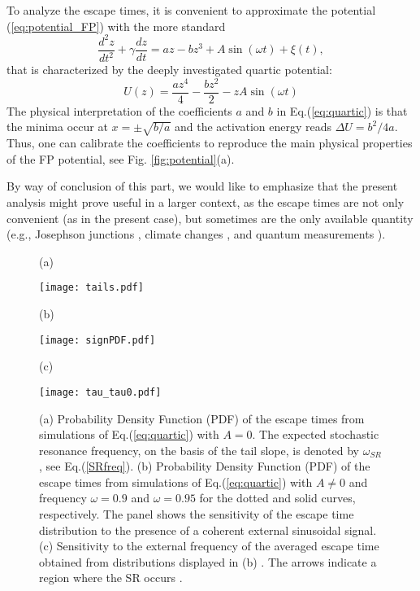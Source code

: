 \documentclass[conference]{IEEEtran}
\newcommand{\beq}{\begin{equation}}
\newcommand{\eeq}{\end{equation}}
\begin{document}
To analyze the escape times, it is convenient to approximate the potential (\ref{eq:potential_FP}) with the more standard 
\beq
\frac{d^2 z}{dt^2} + \gamma \frac{dz}{dt} =  a z - b z^3 + A \sin\left( \omega t \right) +  \xi(t),
\label{eq:quartic}
\eeq
\noindent 
that is characterized by the deeply investigated quartic potential:
\beq
U(z)= \frac{a z^4}{4} - \frac{b z^2}{2} - z A  \sin \left(\omega t \right)
   \label{eq:potential_quartic}
\eeq
The physical interpretation of the coefficients $a$ and $b$ in Eq.(\ref{eq:quartic}) is that the minima occur at $x=\pm \sqrt{{b}/{a}}$ and the activation energy reads $ \Delta U = {b^2}/{4a}$. Thus, one can calibrate the coefficients to reproduce the main physical properties of the FP potential, see Fig. \ref{fig:potential}(a). 

By way of conclusion of this part, we would like to emphasize that the present analysis might prove useful in a larger context, as the escape times are not only convenient (as in the present case), but sometimes are the only available quantity (e.g., Josephson junctions \cite{Addesso12}, climate changes \cite{Benzi82}, and quantum measurements \cite{Aspelmeyer14}). 

\begin{figure}[t]
\centerline{(a) }
\centerline{\texttt{[image: tails.pdf]}}
\centerline{(b) }
\centerline{\texttt{[image: signPDF.pdf]}}
\centerline{(c)}
\centerline{\texttt{[image: tau\_tau0.pdf]}}
\caption{
(a) Probability Density Function (PDF) of the escape times from simulations of Eq.(\ref{eq:quartic}) with $A=0$. The expected stochastic resonance frequency, on the basis of the tail slope, is denoted by $\omega_{SR}$, see Eq.(\ref{SRfreq}).
(b) Probability Density Function (PDF) of the escape times from simulations of Eq.(\ref{eq:quartic}) with $A\neq 0$ and frequency $\omega = 0.9$ and $\omega = 0.95$ for the dotted  and solid curves, respectively. 
The panel shows the sensitivity of the escape time distribution to the presence of a coherent external sinusoidal signal. 
(c) Sensitivity to the external frequency of the averaged escape time obtained from distributions displayed in (b) . The arrows indicate a region where the SR occurs \cite{Addesso12,Pierro04,Pierro98,Gammaitoni98}.
}
\label{fig:distribution}
\end{figure}
\end{document}
